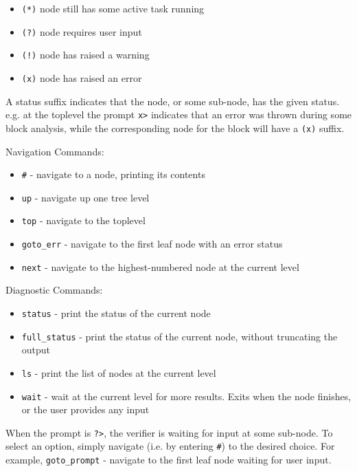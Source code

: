 \begin{itemize}
\item \texttt{(*)} node still has some active task running
\item \texttt{(?)} node requires user input
\item \texttt{(!)} node has raised a warning
\item \texttt{(x)} node has raised an error
\end{itemize}
A status suffix indicates that the node, or some sub-node, has the given status.
e.g. at the toplevel the prompt \texttt{x>} indicates that an error was thrown during some block analysis, while the corresponding node for the block will have a \texttt{(x)} suffix.

Navigation Commands:
\begin{itemize}
\item \texttt{\#} - navigate to a node, printing its contents
\item \texttt{up} - navigate up one tree level
\item \texttt{top} - navigate to the toplevel
\item \texttt{goto\_err} - navigate to the first leaf node with an error status
\item \texttt{next} - navigate to the highest-numbered node at the current level
\end{itemize}
Diagnostic Commands:
\begin{itemize}
\item \texttt{status} - print the status of the current node
\item \texttt{full\_status} - print the status of the current node, without truncating the output
\item \texttt{ls} - print the list of nodes at the current level
\item \texttt{wait} - wait at the current level for more results. Exits when the node finishes, or
the user provides any input
\end{itemize}
When the prompt is \texttt{?>}, the verifier is waiting for input at some sub-node.
To select an option, simply navigate (i.e. by entering \texttt{\#}) to the desired choice.
For example, \texttt{goto\_prompt} - navigate to the first leaf node waiting for user input.


